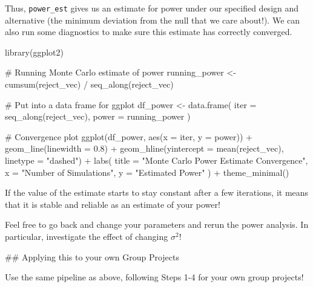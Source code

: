 \documentclass[
  letterpaper,
  DIV=11,
  numbers=noendperiod]{scrartcl}
\newenvironment{Shaded}{\begin{snugshade}}{\end{snugshade}}
\newcommand{\AttributeTok}[1]{\textcolor[rgb]{0.40,0.45,0.13}{#1}}
\newcommand{\CommentTok}[1]{\textcolor[rgb]{0.37,0.37,0.37}{#1}}
\newcommand{\FloatTok}[1]{\textcolor[rgb]{0.68,0.00,0.00}{#1}}
\newcommand{\FunctionTok}[1]{\textcolor[rgb]{0.28,0.35,0.67}{#1}}
\newcommand{\NormalTok}[1]{\textcolor[rgb]{0.00,0.23,0.31}{#1}}
\newcommand{\OtherTok}[1]{\textcolor[rgb]{0.00,0.23,0.31}{#1}}
\newcommand{\SpecialCharTok}[1]{\textcolor[rgb]{0.37,0.37,0.37}{#1}}
\newcommand{\StringTok}[1]{\textcolor[rgb]{0.13,0.47,0.30}{#1}}
\begin{document}
Thus, \texttt{power\_est} gives us an estimate for power under our
specified design and alternative (the minimum deviation from the null
that we care about!). We can also run some diagnostics to make sure this
estimate has correctly converged.

\begin{Shaded}
\begin{Highlighting}[]
\FunctionTok{library}\NormalTok{(ggplot2)}

\CommentTok{\# Running Monte Carlo estimate of power}
\NormalTok{running\_power }\OtherTok{\textless{}{-}} \FunctionTok{cumsum}\NormalTok{(reject\_vec) }\SpecialCharTok{/} \FunctionTok{seq\_along}\NormalTok{(reject\_vec)}

\CommentTok{\# Put into a data frame for ggplot}
\NormalTok{df\_power }\OtherTok{\textless{}{-}} \FunctionTok{data.frame}\NormalTok{(}
  \AttributeTok{iter =} \FunctionTok{seq\_along}\NormalTok{(reject\_vec),}
  \AttributeTok{power =}\NormalTok{ running\_power}
\NormalTok{)}

\CommentTok{\# Convergence plot}
\FunctionTok{ggplot}\NormalTok{(df\_power, }\FunctionTok{aes}\NormalTok{(}\AttributeTok{x =}\NormalTok{ iter, }\AttributeTok{y =}\NormalTok{ power)) }\SpecialCharTok{+}
  \FunctionTok{geom\_line}\NormalTok{(}\AttributeTok{linewidth =} \FloatTok{0.8}\NormalTok{) }\SpecialCharTok{+}
  \FunctionTok{geom\_hline}\NormalTok{(}\AttributeTok{yintercept =} \FunctionTok{mean}\NormalTok{(reject\_vec), }\AttributeTok{linetype =} \StringTok{"dashed"}\NormalTok{) }\SpecialCharTok{+}
  \FunctionTok{labs}\NormalTok{(}
    \AttributeTok{title =} \StringTok{"Monte Carlo Power Estimate Convergence"}\NormalTok{,}
    \AttributeTok{x =} \StringTok{"Number of Simulations"}\NormalTok{,}
    \AttributeTok{y =} \StringTok{"Estimated Power"}
\NormalTok{  ) }\SpecialCharTok{+}
  \FunctionTok{theme\_minimal}\NormalTok{()}
\end{Highlighting}
\end{Shaded}

If the value of the estimate starts to stay constant after a few
iterations, it means that it is stable and reliable as an estimate of
your power!

Feel free to go back and change your parameters and rerun the power
analysis. In particular, investigate the effect of changing
\(\sigma^2\)!

\hfill\break
\#\# Applying this to your own Group Projects

Use the same pipeline as above, following Steps 1-4 for your own group
projects!
\end{document}
